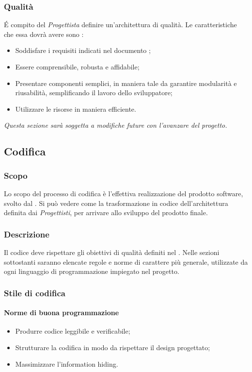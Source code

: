 \subsubsection{Qualità}
\'E compito del \textit{Progettista} definire un'architettura di qualità. Le caratteristiche che essa dovrà avere sono :
\begin{itemize}
  \item Soddisfare i requisiti indicati nel documento \AdR;
  \item Essere comprensibile, robusta e affidabile;
  \item Presentare componenti semplici, in maniera tale da garantire modularità e riusabilità, semplificando il lavoro dello sviluppatore;
  \item Utilizzare le risorse in maniera efficiente.
\end{itemize}

\textit{Questa sezione sarà soggetta a modifiche future con l'avanzare del progetto.}

\subsection{Codifica}
\subsubsection{Scopo}
Lo scopo del processo di codifica è l’effettiva realizzazione del prodotto software, svolto dal \textit{\PR}. Si può vedere come la trasformazione in codice dell’architettura definita dai \textit{Progettisti}, per arrivare allo sviluppo del prodotto finale.

\subsubsection{Descrizione}
Il codice deve rispettare gli obiettivi di qualità definiti nel \PdQ. Nelle sezioni sottostanti saranno elencate regole e norme di carattere più generale, utilizzate da ogni linguaggio di programmazione impiegato nel progetto. 

\subsubsection{Stile di codifica}

\paragraph{Norme di buona programmazione}
\begin{itemize}
\item Produrre codice leggibile e verificabile;
\item Strutturare la codifica in modo da rispettare il design progettato;
\item Massimizzare l'information hiding.
\end{itemize}

